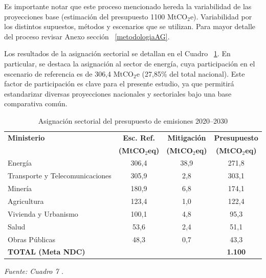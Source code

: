 Es importante notar que este proceso mencionado hereda la variabilidad de las proyecciones base (estimación del presupuesto 1100 MtCO$_2$e). Variabilidad por los distintos supuestos, métodos y escenarios que se utilizan. Para mayor detalle del proceso revisar Anexo sección ~\ref{metodologiaAG}.

Los resultados de la asignación sectorial se detallan en el Cuadro ~\ref{tab:presupuesto_sectorial}. En particular, se destaca la asignación al sector de energía, cuya participación en el escenario de referencia es de 306,4 MtCO$_2$e (27,85\% del total nacional). Este factor de participación es clave para el presente estudio, ya que permitirá estandarizar diversas proyecciones nacionales y sectoriales bajo una base comparativa común.

\begin{table}[H]
\centering
\small
\caption{Asignación sectorial del presupuesto de emisiones 2020--2030}
\label{tab:presupuesto_sectorial}
\renewcommand{\arraystretch}{1.1}
\begin{tabular}{p{3.4cm} c c c}
\hline
\textbf{Ministerio} & 
\textbf{Esc. Ref.} & 
\textbf{Mitigación} & 
\textbf{Presupuesto} \\
 & \textbf{(MtCO$_2$eq)} & \textbf{(MtCO$_2$eq)} & \textbf{(MtCO$_2$eq)} \\
\hline

Energía & 306,4 & 38,9 & 271,8 \\
Transporte y Telecomunicaciones & 305,9 & 2,8 & 303,1 \\
Minería & 180,9 & 6,8 & 174,1 \\
Agricultura & 123,4 & 1,0 & 122,4 \\
Vivienda y Urbanismo & 100,1 & 4,8 & 95,3 \\
Salud & 53,6 & 2,4 & 51,1 \\
Obras Públicas & 48,3 & 0,7 & 43,3 \\

\hline
\textbf{TOTAL (Meta NDC)} & \multicolumn{2}{c}{} & \textbf{1.100} \\
\hline
\end{tabular}

\vspace{0.2cm}
\footnotesize \textit{Fuente: Cuadro 7 .}
\end{table}








